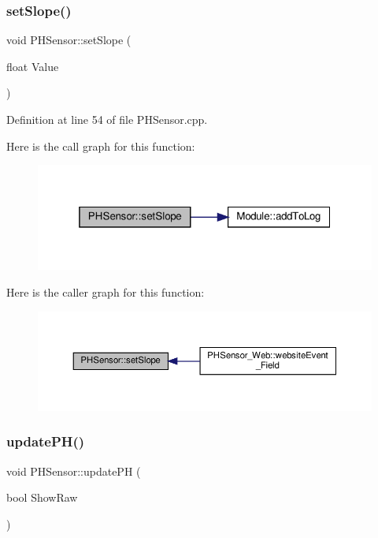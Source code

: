 \subsubsection{\texorpdfstring{set\+Slope()}{setSlope()}\hspace{0.1cm}{\footnotesize\ttfamily [2/2]}}
{\footnotesize\ttfamily void P\+H\+Sensor\+::set\+Slope (\begin{DoxyParamCaption}\item[{float}]{Value }\end{DoxyParamCaption})\hspace{0.3cm}{\ttfamily [protected]}}



Definition at line 54 of file P\+H\+Sensor.\+cpp.

Here is the call graph for this function\+:
\nopagebreak
\begin{figure}[H]
\begin{center}
\leavevmode
\includegraphics[width=319pt]{class_p_h_sensor_ae9b41f458fafd9ae475d9bfbbb27f8d5_cgraph}
\end{center}
\end{figure}
Here is the caller graph for this function\+:
\nopagebreak
\begin{figure}[H]
\begin{center}
\leavevmode
\includegraphics[width=350pt]{class_p_h_sensor_ae9b41f458fafd9ae475d9bfbbb27f8d5_icgraph}
\end{center}
\end{figure}
\mbox{\label{class_p_h_sensor_aefd9f4f73636b8827a22b8246cbc4dee}} 
\subsubsection{\texorpdfstring{update\+P\+H()}{updatePH()}\hspace{0.1cm}{\footnotesize\ttfamily [1/2]}}
{\footnotesize\ttfamily void P\+H\+Sensor\+::update\+PH (\begin{DoxyParamCaption}\item[{bool}]{Show\+Raw }\end{DoxyParamCaption})\hspace{0.3cm}{\ttfamily [protected]}}



